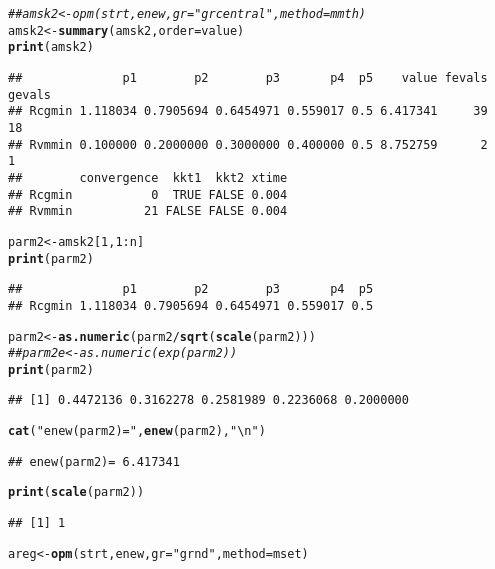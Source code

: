 \documentclass[11pt]{article}\usepackage[]{graphicx}\usepackage[]{color}
\makeatletter
\newcommand{\hlnum}[1]{\textcolor[rgb]{0.686,0.059,0.569}{#1}}%
\newcommand{\hlstr}[1]{\textcolor[rgb]{0.192,0.494,0.8}{#1}}%
\newcommand{\hlcom}[1]{\textcolor[rgb]{0.678,0.584,0.686}{\textit{#1}}}%
\newcommand{\hlopt}[1]{\textcolor[rgb]{0,0,0}{#1}}%
\newcommand{\hlstd}[1]{\textcolor[rgb]{0.345,0.345,0.345}{#1}}%
\newcommand{\hlkwb}[1]{\textcolor[rgb]{0.69,0.353,0.396}{#1}}%
\newcommand{\hlkwc}[1]{\textcolor[rgb]{0.333,0.667,0.333}{#1}}%
\newcommand{\hlkwd}[1]{\textcolor[rgb]{0.737,0.353,0.396}{\textbf{#1}}}%
\newenvironment{kframe}{%
 \def\at@end@of@kframe{}%
 \ifinner\ifhmode%
  \def\at@end@of@kframe{\end{minipage}}%
  \begin{minipage}{\columnwidth}%
 \fi\fi%
 \def\FrameCommand##1{\hskip\@totalleftmargin \hskip-\fboxsep
 \colorbox{shadecolor}{##1}\hskip-\fboxsep
     \hskip-\linewidth \hskip-\@totalleftmargin \hskip\columnwidth}%
 \MakeFramed {\advance\hsize-\width
   \@totalleftmargin\z@ \linewidth\hsize
   \@setminipage}}%
 {\par\unskip\endMakeFramed%
 \at@end@of@kframe}
\newenvironment{knitrout}{}{} %
\makeatother
\begin{document}
\begin{knitrout}
\begin{kframe}
{\ttfamily\noindent\color{warningcolor}{\#\# Warning in Rcgminb(par = spar, fn = efn, gr = egr, lower = slower, upper = supper, : Rcgmin - undefined function}}\begin{alltt}
\hlcom{## amsk2 <- opm(strt, enew, gr="grcentral", method=mmth)}
\hlstd{amsk2} \hlkwb{<-} \hlkwd{summary}\hlstd{(amsk2,} \hlkwc{order}\hlstd{=value)}
\hlkwd{print}\hlstd{(amsk2)}
\end{alltt}
\begin{verbatim}
##              p1        p2        p3       p4  p5    value fevals gevals
## Rcgmin 1.118034 0.7905694 0.6454971 0.559017 0.5 6.417341     39     18
## Rvmmin 0.100000 0.2000000 0.3000000 0.400000 0.5 8.752759      2      1
##        convergence  kkt1  kkt2 xtime
## Rcgmin           0  TRUE FALSE 0.004
## Rvmmin          21 FALSE FALSE 0.004
\end{verbatim}
\begin{alltt}
\hlstd{parm2} \hlkwb{<-} \hlstd{amsk2[}\hlnum{1}\hlstd{,} \hlnum{1}\hlopt{:}\hlstd{n]}
\hlkwd{print}\hlstd{(parm2)}
\end{alltt}
\begin{verbatim}
##              p1        p2        p3       p4  p5
## Rcgmin 1.118034 0.7905694 0.6454971 0.559017 0.5
\end{verbatim}
\begin{alltt}
\hlstd{parm2} \hlkwb{<-} \hlkwd{as.numeric}\hlstd{(parm2}\hlopt{/}\hlkwd{sqrt}\hlstd{(}\hlkwd{scale}\hlstd{(parm2)))}
\hlcom{## parm2e<-as.numeric(exp(parm2))}
\hlkwd{print}\hlstd{(parm2)}
\end{alltt}
\begin{verbatim}
## [1] 0.4472136 0.3162278 0.2581989 0.2236068 0.2000000
\end{verbatim}
\begin{alltt}
\hlkwd{cat}\hlstd{(}\hlstr{"enew(parm2)="}\hlstd{,} \hlkwd{enew}\hlstd{(parm2),}\hlstr{"\textbackslash{}n"}\hlstd{)}
\end{alltt}
\begin{verbatim}
## enew(parm2)= 6.417341
\end{verbatim}
\begin{alltt}
\hlkwd{print}\hlstd{(}\hlkwd{scale}\hlstd{(parm2))}
\end{alltt}
\begin{verbatim}
## [1] 1
\end{verbatim}
\begin{alltt}
\hlstd{areg}\hlkwb{<-} \hlkwd{opm}\hlstd{(strt, enew,} \hlkwc{gr}\hlstd{=}\hlstr{"grnd"}\hlstd{,} \hlkwc{method}\hlstd{=mset)}
\end{alltt}



\end{kframe}
\end{knitrout}
\end{document}
